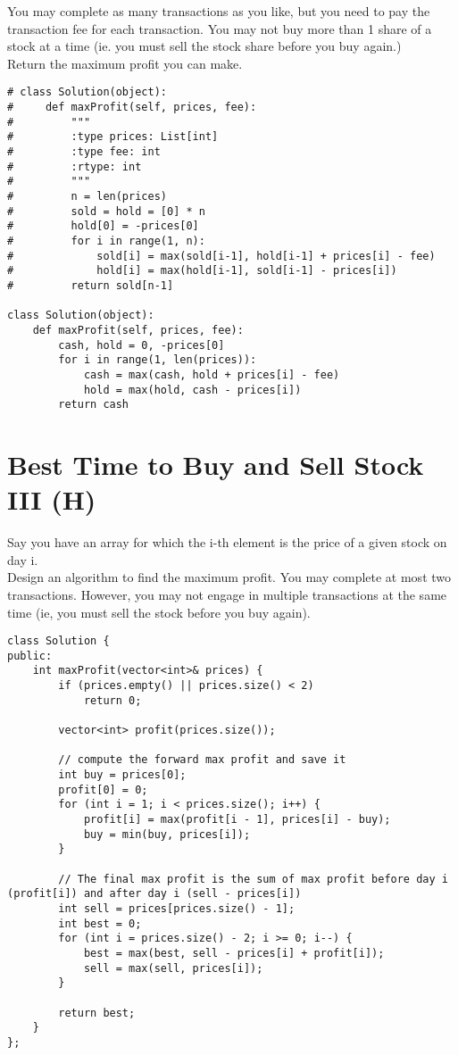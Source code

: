 You may complete as many transactions as you like, but you need to pay the transaction fee for each transaction. You may not buy more than 1 share of a stock at a time (ie. you must sell the stock share before you buy again.)\\

Return the maximum profit you can make.\\

\begin{lstlisting}
# class Solution(object):
#     def maxProfit(self, prices, fee):
#         """
#         :type prices: List[int]
#         :type fee: int
#         :rtype: int
#         """
#         n = len(prices)
#         sold = hold = [0] * n
#         hold[0] = -prices[0]
#         for i in range(1, n):
#             sold[i] = max(sold[i-1], hold[i-1] + prices[i] - fee)
#             hold[i] = max(hold[i-1], sold[i-1] - prices[i])
#         return sold[n-1]
    
class Solution(object):
    def maxProfit(self, prices, fee):
        cash, hold = 0, -prices[0]
        for i in range(1, len(prices)):
            cash = max(cash, hold + prices[i] - fee)
            hold = max(hold, cash - prices[i])
        return cash
\end{lstlisting}

\section{Best Time to Buy and Sell Stock III (H)}
Say you have an array for which the i-th element is the price of a given stock on day i. \\

Design an algorithm to find the maximum profit. You may complete at most two transactions. However, you may not engage in multiple transactions at the same time (ie, you must sell the stock before you buy again). \\

\begin{lstlisting}
class Solution {
public:
    int maxProfit(vector<int>& prices) {
        if (prices.empty() || prices.size() < 2)
            return 0;
        
        vector<int> profit(prices.size());
        
        // compute the forward max profit and save it
        int buy = prices[0];
        profit[0] = 0;
        for (int i = 1; i < prices.size(); i++) {
            profit[i] = max(profit[i - 1], prices[i] - buy);
            buy = min(buy, prices[i]);
        }
        
        // The final max profit is the sum of max profit before day i (profit[i]) and after day i (sell - prices[i])
        int sell = prices[prices.size() - 1];
        int best = 0;
        for (int i = prices.size() - 2; i >= 0; i--) {
            best = max(best, sell - prices[i] + profit[i]);
            sell = max(sell, prices[i]);
        }
        
        return best;   
    }
};
\end{lstlisting}



